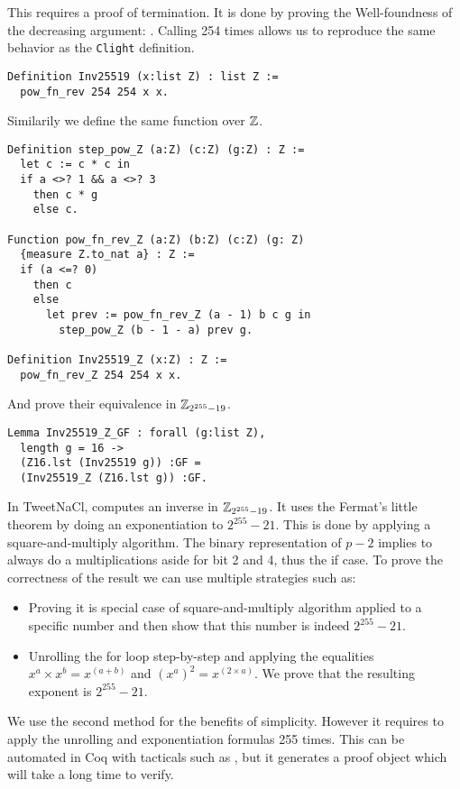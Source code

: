 This  requires a proof of termination. It is done by proving the
Well-foundness of the decreasing argument: . Calling
 254 times allows us to reproduce the same behavior as the \texttt{Clight} definition.
\begin{lstlisting}[language=Coq]
Definition Inv25519 (x:list Z) : list Z :=
  pow_fn_rev 254 254 x x.
\end{lstlisting}
Similarily we define the same function over $\mathbb{Z}$.
\begin{lstlisting}[language=Coq]
Definition step_pow_Z (a:Z) (c:Z) (g:Z) : Z :=
  let c := c * c in
  if a <>? 1 && a <>? 3
    then c * g
    else c.

Function pow_fn_rev_Z (a:Z) (b:Z) (c:Z) (g: Z)
  {measure Z.to_nat a} : Z :=
  if (a <=? 0)
    then c
    else
      let prev := pow_fn_rev_Z (a - 1) b c g in
        step_pow_Z (b - 1 - a) prev g.

Definition Inv25519_Z (x:Z) : Z :=
  pow_fn_rev_Z 254 254 x x.
\end{lstlisting}
And prove their equivalence in $\mathbb{Z}_{2^{255}-19}$.
\begin{lstlisting}[language=Coq]
Lemma Inv25519_Z_GF : forall (g:list Z),
  length g = 16 ->
  (Z16.lst (Inv25519 g)) :GF =
  (Inv25519_Z (Z16.lst g)) :GF.
\end{lstlisting}
In TweetNaCl,  computes an inverse in $\mathbb{Z}_{2^{255}-19}$. It uses the
Fermat's little theorem by doing an exponentiation to $2^{255}-21$.
This is done by applying a square-and-multiply algorithm. The binary representation
of $p-2$ implies to always do a multiplications aside for bit 2 and 4, thus the if case.
To prove the correctness of the result we can use multiple strategies such as:
\begin{itemize}
  \item Proving it is special case of square-and-multiply algorithm applied to
  a specific number and then show that this number is indeed $2^{255}-21$.
  \item Unrolling the for loop step-by-step and applying the equalities
  $x^a \times x^b = x^{(a+b)}$ and $(x^a)^2 = x^{(2 \times a)}$. We prove that
  the resulting exponent is $2^{255}-21$.
\end{itemize}
We use the second method for the benefits of simplicity. However it requires to
apply the unrolling and exponentiation formulas 255 times. This can be automated
in Coq with tacticals such as , but it generates a proof object which
will take a long time to verify.

